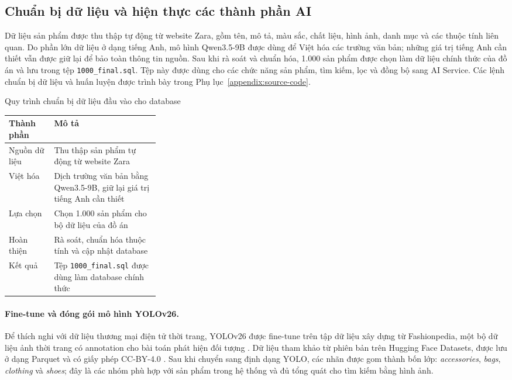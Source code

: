 \subsection{Chuẩn bị dữ liệu và hiện thực các thành phần AI}

Dữ liệu sản phẩm được thu thập tự động từ website Zara, gồm tên, mô tả, màu sắc, chất liệu, hình ảnh, danh mục và các thuộc tính liên quan. Do phần lớn dữ liệu ở dạng tiếng Anh, mô hình Qwen3.5-9B được dùng để Việt hóa các trường văn bản; những giá trị tiếng Anh cần thiết vẫn được giữ lại để bảo toàn thông tin nguồn. Sau khi rà soát và chuẩn hóa, 1.000 sản phẩm được chọn làm dữ liệu chính thức của đồ án và lưu trong tệp \texttt{1000\_final.sql}. Tệp này được dùng cho các chức năng sản phẩm, tìm kiếm, lọc và đồng bộ sang AI Service. Các lệnh chuẩn bị dữ liệu và huấn luyện được trình bày trong Phụ lục~\ref{appendix:source-code}.

\begin{breakabletable}
\centering
\caption{Quy trình chuẩn bị dữ liệu đầu vào cho database}
\label{tab:database-input-dataset}
\begin{tabularx}{\linewidth}{|p{0.30\linewidth}|X|}
\hline
\textbf{Thành phần} & \textbf{Mô tả} \\ \hline
Nguồn dữ liệu & Thu thập sản phẩm tự động từ website Zara \\ \hline
Việt hóa & Dịch trường văn bản bằng Qwen3.5-9B, giữ lại giá trị tiếng Anh cần thiết \\ \hline
Lựa chọn & Chọn 1.000 sản phẩm cho bộ dữ liệu của đồ án \\ \hline
Hoàn thiện & Rà soát, chuẩn hóa thuộc tính và cập nhật database \\ \hline
Kết quả & Tệp \texttt{1000\_final.sql} được dùng làm database chính thức \\ \hline
\end{tabularx}
\end{breakabletable}

\paragraph{Fine-tune và đóng gói mô hình YOLOv26.}
Để thích nghi với dữ liệu thương mại điện tử thời trang, YOLOv26 được fine-tune trên tập dữ liệu xây dựng từ Fashionpedia, một bộ dữ liệu ảnh thời trang có annotation cho bài toán phát hiện đối tượng \parencite{jia2020fashionpedia}. Dữ liệu tham khảo từ phiên bản trên Hugging Face Datasets, được lưu ở dạng Parquet và có giấy phép CC-BY-4.0 \parencite{huggingfaceFashionpedia}. Sau khi chuyển sang định dạng YOLO, các nhãn được gom thành bốn lớp: \textit{accessories}, \textit{bags}, \textit{clothing} và \textit{shoes}; đây là các nhóm phù hợp với sản phẩm trong hệ thống và đủ tổng quát cho tìm kiếm bằng hình ảnh.

